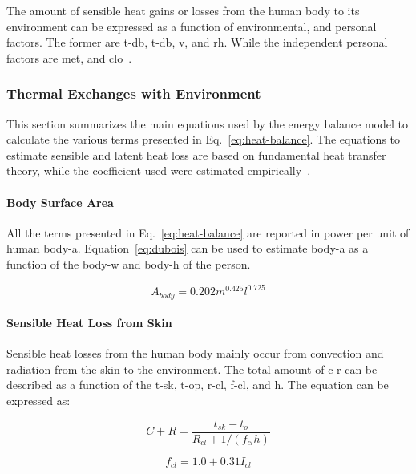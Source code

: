 The amount of sensible heat gains or losses from the human body to its environment can be expressed as a function of environmental, and personal factors.
The former are \ac{t-db}, \ac{t-db}, \ac{v}, and \ac{rh}.
While the independent personal factors are \ac{met}, and \ac{clo}~\cite{ASHRA2017}.

\subsubsection{Thermal Exchanges with Environment}\label{subsubsec:thermal-exchanges-with-environment}

This section summarizes the main equations used by the energy balance model to calculate the various terms presented in Eq.~\ref{eq:heat-balance}.
The equations to estimate sensible and latent heat loss are based on fundamental heat transfer theory, while the coefficient used were estimated empirically~\cite{ASHRA2017}.

\paragraph{Body Surface Area}

All the terms presented in Eq.~\ref{eq:heat-balance} are reported in power per unit of human \ac{body-a}.
 Equation~\ref{eq:dubois} can be used to estimate \ac{body-a} as a function of the \ac{body-w} and \ac{body-h} of the person.

\begin{equation}
    A_{body} = 0.202 m^{0.425} l^{0.725}\label{eq:dubois}
\end{equation}


\paragraph{Sensible Heat Loss from Skin}

Sensible heat losses from the human body mainly occur from convection and radiation from the skin to the environment.
The total amount of \ac{c-r} can be described as a function of the \ac{t-sk}, \ac{t-op}, \ac{r-cl}, \ac{f-cl}, and \ac{h}.
The equation can be expressed as:

\begin{equation}
    C+R=\frac{t_{s k}-t_{o}}{R_{c l}+1 /\left(f_{c l} h\right)}\label{eq:c-r}
\end{equation}

\begin{equation}
    f_{cl}=1.0 + 0.31 I_{cl} \label{eq:f-cl}
\end{equation}

